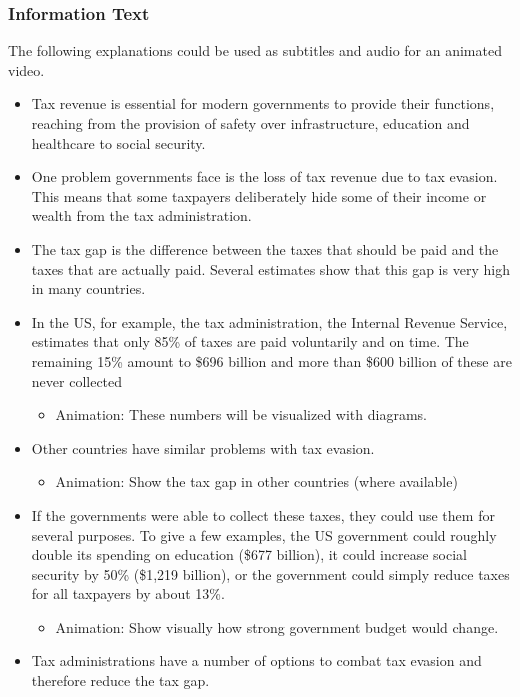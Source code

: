 \documentclass[11pt]{article}
\begin{document}
\subsubsection*{Information Text}
The following explanations could be used as subtitles and audio for an animated video.
\begin{itemize}
\item Tax revenue is essential for modern governments to provide their functions, reaching from the provision of safety over infrastructure, education and healthcare to social security.
\item One problem governments face is the loss of tax revenue due to tax evasion. This means that some taxpayers deliberately hide some of their income or wealth from the tax administration. 
\item The tax gap is the difference between the taxes that should be paid and the taxes that are actually paid. Several estimates show that this gap is very high in many countries.
\item In the US, for example, the tax administration, the Internal Revenue Service, estimates that only 85\% of taxes are paid voluntarily and on time. The remaining 15\% amount to \$696 billion and more than \$600 billion of these are never collected
\begin{itemize}
    \item Animation: These numbers will be visualized with diagrams.
\end{itemize}
\item Other countries have similar problems with tax evasion.
\begin{itemize}
    \item Animation: Show the tax gap in other countries (where available)
\end{itemize}
\item If the governments were able to collect these taxes, they  could use them for several purposes. To give a few examples, the US government could roughly double its spending on education (\$677 billion), it could increase social security by 50\% (\$1,219 billion), or the government could simply reduce taxes for all taxpayers by about 13\%. 
\begin{itemize}
    \item Animation: Show visually how strong government budget would change. 
\end{itemize}
\item Tax administrations have a number of options to combat tax evasion and therefore reduce the tax gap.

\end{itemize}
\end{document}

